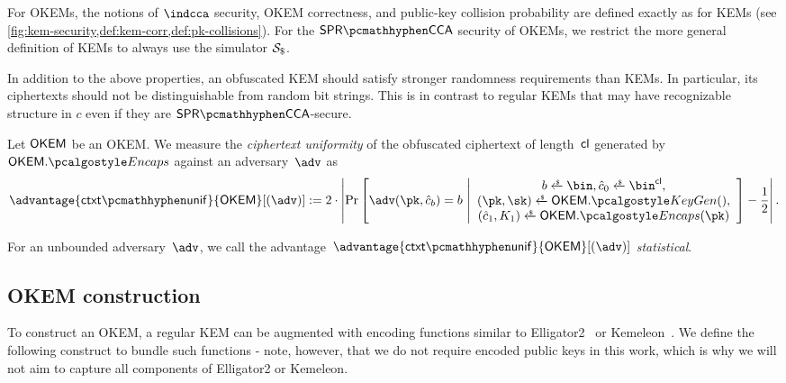 For OKEMs, the notions of $\indcca$ security, OKEM correctness, and public-key collision probability are defined exactly as for KEMs (see \cref{fig:kem-security,def:kem-corr,def:pk-collisions}). For the $\sprcca$ security of OKEMs, we restrict the more general definition of KEMs to always use the simulator $\simulbin$.

In addition to the above properties, an obfuscated KEM should satisfy stronger randomness requirements than KEMs. In particular, its ciphertexts should not be distinguishable from random bit strings. This is in contrast to regular KEMs that may have recognizable structure in $c$ even if they are $\sprcca$-secure.

\begin{definition}
\label{def:ctxt-uniformity}
    Let $\mathsf{OKEM}$ be an OKEM.
    We measure the \emph{ciphertext uniformity} of the obfuscated ciphertext of length~$\mathsf{cl}$ generated by $\OKEM.\encaps$ against an adversary~$\adv$ as
    \[
        \advantage{\ctxtunif}{\OKEM}[(\adv)] := 
        2 \cdot \left|
        \Pr\left[
            \adv(\pk, \hat c_b) = b
        ~\middle|
            \begin{array}{c}
                b \getsr \bin, \hat c_0 \getsr \bin^{\obfctxtlen}, \\
                (\pk,\sk) \getsr \OKEM.\kgen(),\\
                (\hat c_1, K_1) \getsr \OKEM.\encaps(\pk)
            \end{array}
        \right]
        - \frac{1}{2}
        \right|.
    \]
    
    For an unbounded adversary~$\adv$, we call the advantage~$\advantage{\ctxtunif}{\OKEM}[(\adv)] $ \emph{statistical}.
\end{definition}

\subsection{OKEM construction}

To construct an OKEM, a regular KEM can be augmented with encoding functions similar to \textsf{Elligator2}~\cite{CCS:BHKL13} or \textsf{Kemeleon}~\cite[Sec. 2.4]{CCS:GunSteVei24}. We define the following construct to bundle such functions - note, however, that we do not require encoded public keys in this work, which is why we will not aim to capture all components of \textsf{Elligator2} or \textsf{Kemeleon}. 

